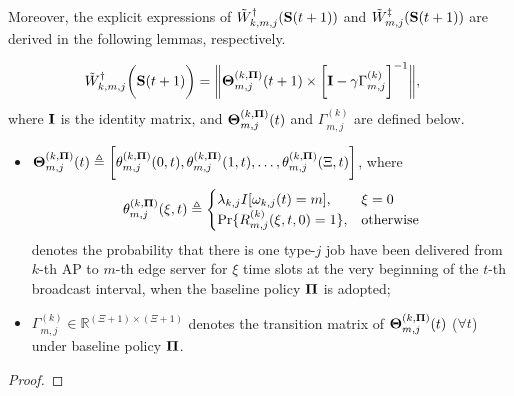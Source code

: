 Moreover, the explicit expressions of $\tilde{W}^{\dagger}_{k,m,j}(\mathbf{S}(t+1))$ and $\tilde{W}^{\ddagger}_{m,j}(\mathbf{S}(t+1))$ are derived in the following lemmas, respectively.

\begin{lemma}
    \label{lemma:w_ap}
    \begin{align}
        &\tilde{W}^{\dagger}_{k,m,j}\bigg(\mathbf{S}(t+1)\bigg) =
        \bigg\|
            \boldsymbol{\Theta}^{(k, \boldsymbol{\Pi})}_{m,j}(t+1) \times
            \bigg[
                \mathbf{I} - \gamma \Gamma^{(k)}_{m,j}
            \bigg]^{-1}
        \bigg\|,
        \label{w_ap}
    \end{align}
    where $\mathbf{I}$ is the identity matrix, and $\boldsymbol{\Theta}^{(k, \boldsymbol{\Pi})}_{m,j}(t)$ and $\Gamma^{(k)}_{m,j}$ are defined below.
    \begin{itemize}
        \item {\small $\boldsymbol{\Theta}^{(k,\boldsymbol{\Pi})}_{m,j}(t) \triangleq \bigg[
            \theta^{(k,\boldsymbol{\Pi})}_{m,j}(0,t),
            \theta^{(k,\boldsymbol{\Pi})}_{m,j}(1,t),
            \dots,
            \theta^{(k,\boldsymbol{\Pi})}_{m,j}(\Xi,t)
            \bigg]$},
        where 
        \begin{align}
            \theta^{(k,\boldsymbol{\Pi})}_{m,j}(\xi,t) \triangleq 
            \begin{cases}
                \lambda_{k,j} I[\omega_{k,j}(t)=m], & \xi=0
                \\
                \Pr\{R^{(k)}_{m,j}(\xi,t,0) = 1\}, & \text{otherwise}
            \end{cases}
        \end{align}
        denotes the probability that there is one type-$j$ job have been delivered from $k$-th AP to $m$-th edge server for $\xi$ time slots at the very beginning of the $t$-th broadcast interval, when the baseline policy $\boldsymbol{\Pi}$ is adopted;
        \item $\Gamma^{(k)}_{m,j} \in \mathbb{R}^{(\Xi+1)\times(\Xi+1)}$ denotes the transition matrix of $\boldsymbol{\Theta}^{(k,\boldsymbol{\Pi})}_{m,j}(t)$ ($\forall t$) under baseline policy $\boldsymbol{\Pi}$. %
    \end{itemize}
\end{lemma}
\begin{proof}
\end{proof}

